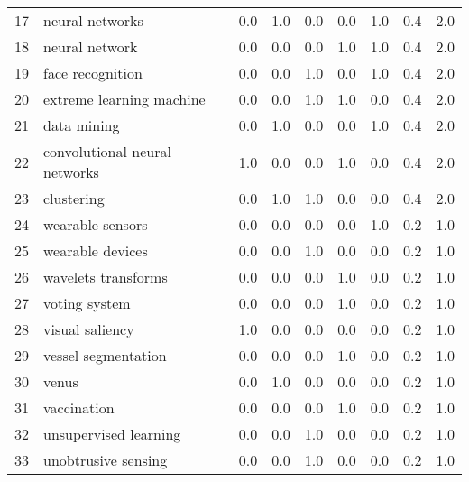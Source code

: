 \begin{tabular}{llrrrrrrr}
17 &                                 neural networks &   0.0 &   1.0 &   0.0 &   0.0 &   1.0 &   0.4 &    2.0 \\
18 &                                  neural network &   0.0 &   0.0 &   0.0 &   1.0 &   1.0 &   0.4 &    2.0 \\
19 &                                face recognition &   0.0 &   0.0 &   1.0 &   0.0 &   1.0 &   0.4 &    2.0 \\
20 &                        extreme learning machine &   0.0 &   0.0 &   1.0 &   1.0 &   0.0 &   0.4 &    2.0 \\
21 &                                     data mining &   0.0 &   1.0 &   0.0 &   0.0 &   1.0 &   0.4 &    2.0 \\
22 &                   convolutional neural networks &   1.0 &   0.0 &   0.0 &   1.0 &   0.0 &   0.4 &    2.0 \\
23 &                                      clustering &   0.0 &   1.0 &   1.0 &   0.0 &   0.0 &   0.4 &    2.0 \\
24 &                                wearable sensors &   0.0 &   0.0 &   0.0 &   0.0 &   1.0 &   0.2 &    1.0 \\
25 &                                wearable devices &   0.0 &   0.0 &   1.0 &   0.0 &   0.0 &   0.2 &    1.0 \\
26 &                             wavelets transforms &   0.0 &   0.0 &   0.0 &   1.0 &   0.0 &   0.2 &    1.0 \\
27 &                                   voting system &   0.0 &   0.0 &   0.0 &   1.0 &   0.0 &   0.2 &    1.0 \\
28 &                                 visual saliency &   1.0 &   0.0 &   0.0 &   0.0 &   0.0 &   0.2 &    1.0 \\
29 &                             vessel segmentation &   0.0 &   0.0 &   0.0 &   1.0 &   0.0 &   0.2 &    1.0 \\
30 &                                           venus &   0.0 &   1.0 &   0.0 &   0.0 &   0.0 &   0.2 &    1.0 \\
31 &                                     vaccination &   0.0 &   0.0 &   0.0 &   1.0 &   0.0 &   0.2 &    1.0 \\
32 &                           unsupervised learning &   0.0 &   0.0 &   1.0 &   0.0 &   0.0 &   0.2 &    1.0 \\
33 &                             unobtrusive sensing &   0.0 &   0.0 &   1.0 &   0.0 &   0.0 &   0.2 &    1.0 \\

\end{tabular}
